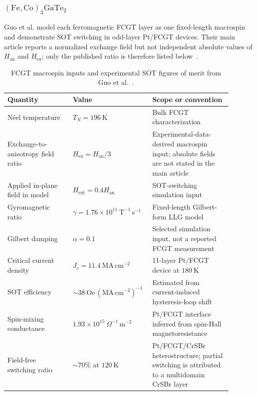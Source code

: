 \subsubsection{\texorpdfstring{$(\mathrm{Fe,Co})_3\mathrm{GaTe}_2$}{(Fe,Co)3GaTe2}}

Guo et al. model each ferromagnetic FCGT layer as one fixed-length macrospin and
demonstrate SOT switching in odd-layer Pt/FCGT devices.  Their main article
reports a normalized exchange field but not independent absolute values of
$H_{\mathrm{an}}$ and $H_{\mathrm{ex}}$; only the published ratio is therefore
listed below~\cite{guo2025fcgt-sot}.

\begin{table}[htbp]
    \centering
    \small
    \renewcommand{\arraystretch}{1.12}
    \begin{tabular}{p{0.29\linewidth}p{0.27\linewidth}p{0.34\linewidth}}
        \hline
        Quantity & Value & Scope or convention \\
        \hline
        N\'eel temperature
            & $T_N=196\ \mathrm{K}$
            & Bulk FCGT characterization \\
        Exchange-to-anisotropy field ratio
            & $H_{\mathrm{ex}}=H_{\mathrm{an}}/3$
            & Experimental-data-derived macrospin input; absolute fields are
              not stated in the main article \\
        Applied in-plane field in model
            & $H_{\mathrm{ext}}=0.4H_{\mathrm{an}}$
            & SOT-switching simulation input \\
        Gyromagnetic ratio
            & $\gamma=1.76\times10^{11}\ \mathrm{T^{-1}\,s^{-1}}$
            & Fixed-length Gilbert-form LLG model \\
        Gilbert damping
            & $\alpha=0.1$
            & Selected simulation input, not a reported FCGT measurement \\
        Critical current density
            & $J_c=11.4\ \mathrm{MA\,cm^{-2}}$
            & 11-layer Pt/FCGT device at $180\ \mathrm{K}$ \\
        SOT efficiency
            & $\sim38\ \mathrm{Oe}\,(\mathrm{MA\,cm^{-2}})^{-1}$
            & Estimated from current-induced hysteresis-loop shift \\
        Spin-mixing conductance
            & $1.93\times10^{15}\ \Omega^{-1}\,\mathrm{m^{-2}}$
            & Pt/FCGT interface inferred from spin-Hall magnetoresistance \\
        Field-free switching ratio
            & $\sim70\%$ at $120\ \mathrm{K}$
            & Pt/FCGT/CrSBr heterostructure; partial switching is attributed
              to a multidomain CrSBr layer \\
        \hline
    \end{tabular}
    \caption{FCGT macrospin inputs and experimental SOT figures of merit from
        Guo et al.~\cite{guo2025fcgt-sot}.}
    \label{tab:fcgt-sot-parameters}
\end{table}

